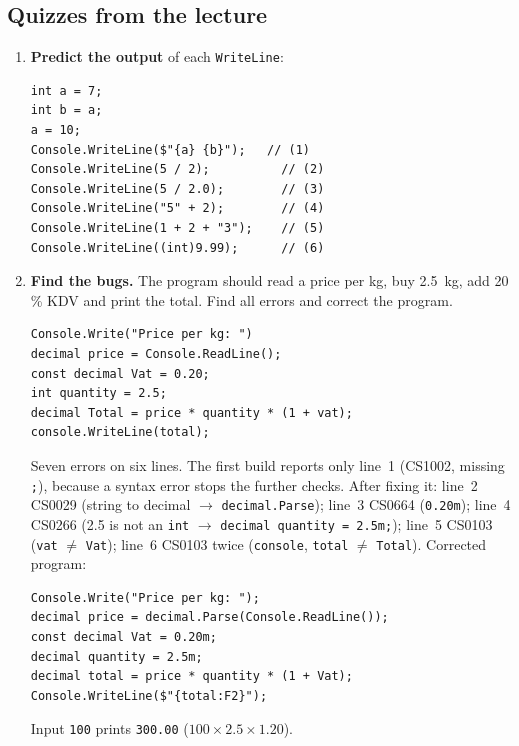 \subsection{Quizzes from the lecture}
\begin{enumerate}[label=\textbf{Q\arabic*.},leftmargin=*,itemsep=1pt]
  \item {} \textbf{Predict the output} of each \texttt{WriteLine}:
\begin{lstlisting}
int a = 7;
int b = a;
a = 10;
Console.WriteLine($"{a} {b}");   // (1)
Console.WriteLine(5 / 2);          // (2)
Console.WriteLine(5 / 2.0);        // (3)
Console.WriteLine("5" + 2);        // (4)
Console.WriteLine(1 + 2 + "3");    // (5)
Console.WriteLine((int)9.99);      // (6)
\end{lstlisting}

  \item {} \textbf{Find the bugs.} The program should read a price per kg, buy 2.5~kg, add 20\,\% KDV and print the total. Find all errors and correct the program.
\begin{lstlisting}
Console.Write("Price per kg: ")
decimal price = Console.ReadLine();
const decimal Vat = 0.20;
int quantity = 2.5;
decimal Total = price * quantity * (1 + vat);
console.WriteLine(total);
\end{lstlisting}
  \ifsolutions\begin{solbox}Seven errors on six lines. The first build reports only line~1 (CS1002, missing \texttt{;}), because a syntax error stops the further checks. After fixing it: line~2 CS0029 (string to decimal $\to$ \texttt{decimal.Parse}); line~3 CS0664 (\texttt{0.20m}); line~4 CS0266 (2.5 is not an \texttt{int} $\to$ \texttt{decimal quantity = 2.5m;}); line~5 CS0103 (\texttt{vat} $\ne$ \texttt{Vat}); line~6 CS0103 twice (\texttt{console}, \texttt{total} $\ne$ \texttt{Total}). Corrected program:

\begin{lstlisting}[numbers=none]
Console.Write("Price per kg: ");
decimal price = decimal.Parse(Console.ReadLine());
const decimal Vat = 0.20m;
decimal quantity = 2.5m;
decimal total = price * quantity * (1 + Vat);
Console.WriteLine($"{total:F2}");
\end{lstlisting}

Input \texttt{100} prints \texttt{300.00} ($100 \times 2.5 \times 1.20$).
\end{solbox}\fi
\end{enumerate}

